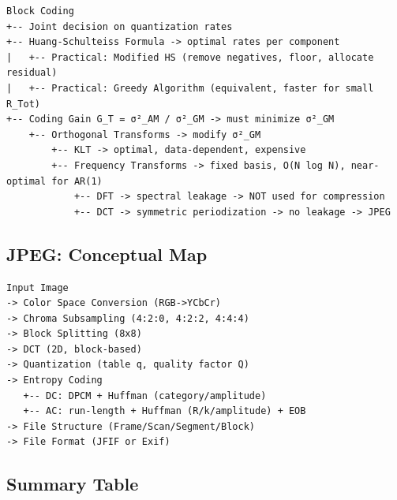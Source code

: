\begin{verbatim}
Block Coding
+-- Joint decision on quantization rates
+-- Huang-Schulteiss Formula -> optimal rates per component
|   +-- Practical: Modified HS (remove negatives, floor, allocate residual)
|   +-- Practical: Greedy Algorithm (equivalent, faster for small R_Tot)
+-- Coding Gain G_T = σ²_AM / σ²_GM -> must minimize σ²_GM
    +-- Orthogonal Transforms -> modify σ²_GM
        +-- KLT -> optimal, data-dependent, expensive
        +-- Frequency Transforms -> fixed basis, O(N log N), near-optimal for AR(1)
            +-- DFT -> spectral leakage -> NOT used for compression
            +-- DCT -> symmetric periodization -> no leakage -> JPEG

\end{verbatim}

\subsection{JPEG: Conceptual Map}

\begin{verbatim}
Input Image
-> Color Space Conversion (RGB->YCbCr)
-> Chroma Subsampling (4:2:0, 4:2:2, 4:4:4)
-> Block Splitting (8x8)
-> DCT (2D, block-based)
-> Quantization (table q, quality factor Q)
-> Entropy Coding
   +-- DC: DPCM + Huffman (category/amplitude)
   +-- AC: run-length + Huffman (R/k/amplitude) + EOB
-> File Structure (Frame/Scan/Segment/Block)
-> File Format (JFIF or Exif)

\end{verbatim}

\subsection{Summary Table}

